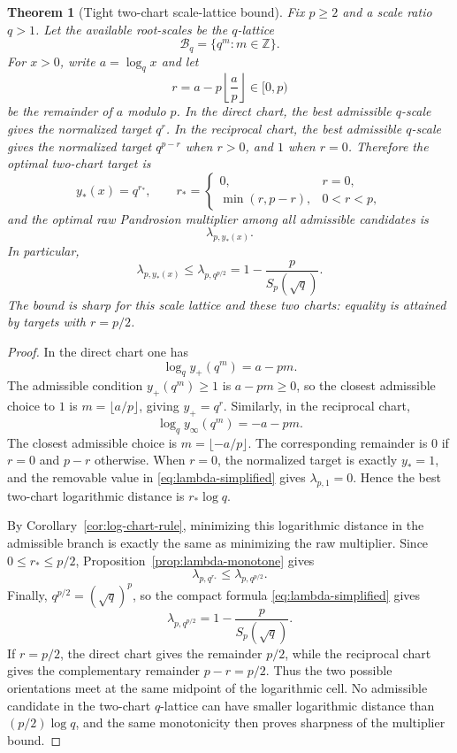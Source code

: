 \documentclass[10pt,a4paper]{article}
\theoremstyle{plain}
\newtheorem{theorem}{Theorem}[section]
\theoremstyle{definition}
\theoremstyle{remark}
\begin{document}
\begin{theorem}[Tight two-chart scale-lattice bound]
\label{thm:q-lattice-two-chart}
Fix $p\ge2$ and a scale ratio $q>1$.  Let the available root-scales be the
$q$-lattice
\[
  \mathcal B_q=\{q^m:m\in\mathbb Z\}.
\]
For $x>0$, write $a=\log_q x$ and let
\[
  r=a-p\left\lfloor \frac{a}{p}\right\rfloor\in[0,p)
\]
be the remainder of $a$ modulo $p$.  In the direct chart, the best admissible
$q$-scale gives the normalized target $q^r$.  In the reciprocal chart, the best
admissible $q$-scale gives the normalized target $q^{p-r}$ when $r>0$, and $1$
when $r=0$.  Therefore the optimal two-chart target is
\[
  y_*(x)=q^{r_*},
  \qquad
  r_*=
  \begin{cases}
    0, & r=0,\\
    \min(r,p-r), & 0<r<p,
  \end{cases}
\]
and the optimal raw Pandrosion multiplier among all admissible candidates is
\[
  \lambda_{p,y_*(x)}.
\]
In particular,
\begin{equation}
  \lambda_{p,y_*(x)}
  \le \lambda_{p,q^{p/2}}
  =1-\frac{p}{S_p(\sqrt q)}.
  \label{eq:q-lattice-two-chart-bound}
\end{equation}
The bound is sharp for this scale lattice and these two charts: equality is
attained by targets with $r=p/2$.
\end{theorem}

\begin{proof}
In the direct chart one has
\[
  \log_q y_+(q^m)=a-pm.
\]
The admissible condition $y_+(q^m)\ge1$ is $a-pm\ge0$, so the closest admissible
choice to $1$ is $m=\lfloor a/p\rfloor$, giving $y_+=q^r$.  Similarly, in the
reciprocal chart,
\[
  \log_q y_\infty(q^m)=-a-pm.
\]
The closest admissible choice is $m=\lfloor -a/p\rfloor$.  The corresponding
remainder is $0$ if $r=0$ and $p-r$ otherwise.  When $r=0$, the normalized
target is exactly $y_*=1$, and the removable value in
\eqref{eq:lambda-simplified} gives $\lambda_{p,1}=0$.  Hence the best
two-chart logarithmic distance is $r_*\log q$.

By Corollary~\ref{cor:log-chart-rule}, minimizing this logarithmic distance in
the admissible branch is exactly the same as minimizing the raw multiplier.
Since $0\le r_*\le p/2$, Proposition~\ref{prop:lambda-monotone} gives
\[
  \lambda_{p,q^{r_*}}\le \lambda_{p,q^{p/2}}.
\]
Finally, $q^{p/2}=(\sqrt q)^p$, so the compact formula
\eqref{eq:lambda-simplified} gives
\[
  \lambda_{p,q^{p/2}}=1-\frac{p}{S_p(\sqrt q)}.
\]
If $r=p/2$, the direct chart gives the remainder $p/2$, while the reciprocal
chart gives the complementary remainder $p-r=p/2$.  Thus the two possible
orientations meet at the same midpoint of the logarithmic cell.  No admissible
candidate in the two-chart $q$-lattice can have smaller logarithmic distance
than $(p/2)\log q$, and the same monotonicity then proves sharpness of the
multiplier bound.
\end{proof}
\end{document}
